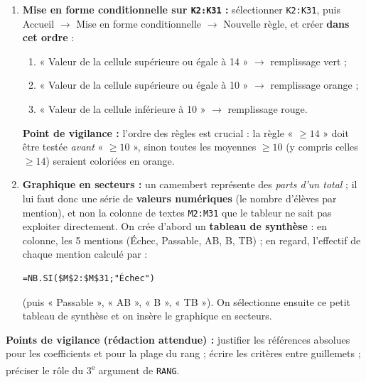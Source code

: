 \documentclass[11pt]{article}
\begin{document}
\begin{corrige}
\begin{enumerate}
    \item \textbf{Mise en forme conditionnelle sur \texttt{K2:K31} :} sélectionner \texttt{K2:K31}, puis Accueil $\rightarrow$ Mise en forme conditionnelle $\rightarrow$ Nouvelle règle, et créer \textbf{dans cet ordre} :
    \begin{enumerate}
        \item « Valeur de la cellule supérieure ou égale à 14 » $\rightarrow$ remplissage vert ;
        \item « Valeur de la cellule supérieure ou égale à 10 » $\rightarrow$ remplissage orange ;
        \item « Valeur de la cellule inférieure à 10 » $\rightarrow$ remplissage rouge.
    \end{enumerate}
    \textbf{Point de vigilance :} l'ordre des règles est crucial : la règle « $\ge 14$ » doit être testée \emph{avant} « $\ge 10$ », sinon toutes les moyennes $\ge 10$ (y compris celles $\ge 14$) seraient coloriées en orange.
    \item \textbf{Graphique en secteurs :} un camembert représente des \emph{parts d'un total} ; il lui faut donc une série de \textbf{valeurs numériques} (le nombre d'élèves par mention), et non la colonne de textes \texttt{M2:M31} que le tableur ne sait pas exploiter directement. On crée d'abord un \textbf{tableau de synthèse} : en colonne, les 5 mentions (Échec, Passable, AB, B, TB) ; en regard, l'effectif de chaque mention calculé par :
\begin{lstlisting}
=NB.SI($M$2:$M$31;"Échec")
\end{lstlisting}
    (puis « Passable », « AB », « B », « TB »). On sélectionne ensuite ce petit tableau de synthèse et on insère le graphique en secteurs.
\end{enumerate}
\textbf{Points de vigilance (rédaction attendue) :} justifier les références absolues pour les coefficients et pour la plage du rang ; écrire les critères entre guillemets ; préciser le rôle du 3\textsuperscript{e} argument de \texttt{RANG}.
\end{corrige}
\end{document}
